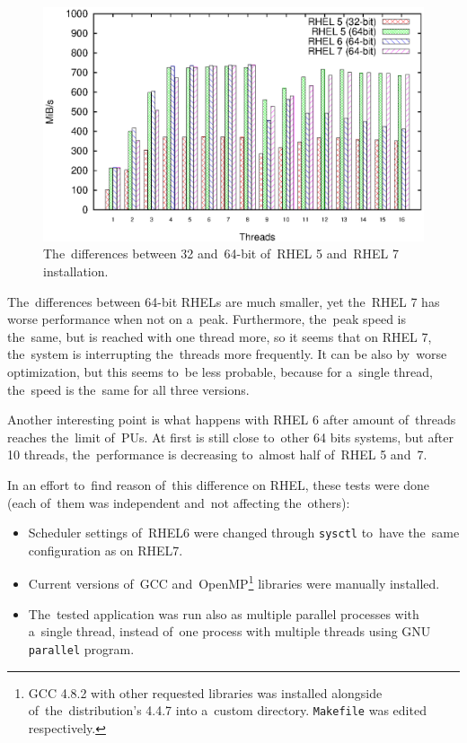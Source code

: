 \begin{figure}[h!]
  \centering
 \includegraphics[width=15cm]{fig/tests/difference.eps} %
\caption{The~differences between 32 and~64-bit of~RHEL 5 and~RHEL 7 installation.}
\label{fig:testing:difference}
\end{figure}

\par{
The~differences between 64-bit RHELs are much smaller, yet the~RHEL 7 has worse performance when not on a~peak. Furthermore, the~peak speed is the~same, but is reached with one thread more, so it seems that on RHEL 7, the~system is interrupting the~threads more frequently. It can be also by~worse optimization, but this seems to~be less probable, because for a~single thread, the~speed is the~same for all three versions.
}

\par{
Another interesting point is what happens with RHEL 6 after amount of~threads reaches the~limit of~PUs. At first is still close to~other 64 bits systems, but after 10 threads, the~performance is decreasing to~almost half of~RHEL 5 and~7.
}

\par{
In an effort to~find reason of~this difference on RHEL, these tests were done (each of~them was independent and~not affecting the~others):
\begin{itemize}
\item Scheduler settings of~RHEL6 were changed through {\tt sysctl} to~have the~same configuration as on RHEL7.
\item Current versions of~GCC and~OpenMP\footnote{GCC 4.8.2 
with other requested libraries was installed alongside of~the~distribution's 4.4.7 
into a~custom directory. {\tt Makefile} was edited respectively.} %
libraries were manually installed.
\item The~tested application was run also as multiple parallel processes with a~single thread, instead of~one process with multiple threads using GNU {\tt parallel} program.
\end{itemize}
}

